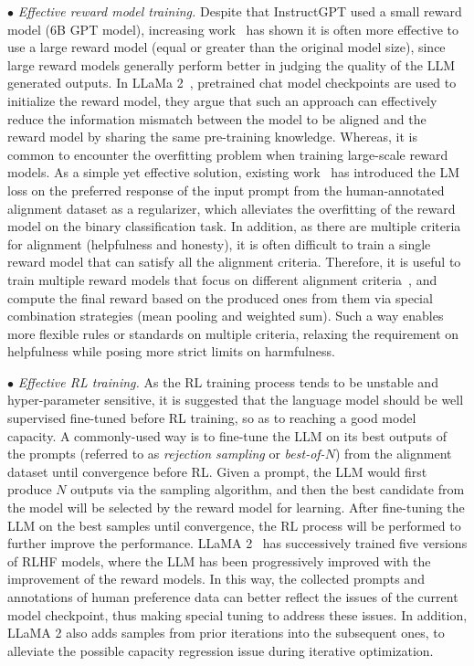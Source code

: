 {$\bullet$ \textit{Effective reward model training.} 
Despite that InstructGPT used a small reward model (6B GPT model), increasing work~\cite{Touvron-2023-llama2-arxiv} has shown it is often more effective to use a large reward model (\eg  equal or greater than the original model size), since large reward models generally perform better in judging the quality of the LLM generated outputs. 
In LLaMa 2~\cite{Touvron-2023-llama2-arxiv},  pretrained chat model checkpoints are used 
to initialize the reward model, they argue that such an approach can effectively reduce the information mismatch between the model to be aligned and the reward model by sharing the same pre-training knowledge.   
Whereas, it is common to encounter the overfitting problem when training large-scale reward models. As a simple yet effective solution, existing work~\cite{askell2021general,zheng2023secrets} has introduced the LM loss on the preferred response of the input prompt from the human-annotated alignment dataset as a regularizer, which alleviates the overfitting of the reward model on the binary classification task. 
In addition, as there are multiple criteria for alignment (\eg helpfulness and honesty), it is often difficult to train a single reward model that can satisfy all the alignment  criteria.
Therefore, it is useful to train multiple reward models that focus on different alignment criteria~\cite{Touvron-2023-llama2-arxiv}, and compute the final reward based on the produced ones from them via special combination strategies (\eg mean pooling and weighted sum).
Such a way enables more  flexible rules or standards on multiple  criteria, \eg  
relaxing the requirement on helpfulness while posing more strict limits on harmfulness.} 

{$\bullet$ \textit{Effective RL training.}
As the RL training process tends to  be unstable and hyper-parameter sensitive,
it is suggested that the language model should be well supervised fine-tuned
 before RL training, so as to reaching a good model capacity.  
A commonly-used way is to fine-tune the LLM on its best outputs of the prompts (referred to as \emph{rejection sampling} or \emph{best-of-$N$}) from the alignment dataset until convergence before RL.
Given a prompt, the LLM would first produce $N$ outputs via the sampling algorithm, and then the best candidate from the model will be selected by the reward model for learning.
After fine-tuning the LLM on the best samples until convergence, the RL  process will be performed to further improve the performance.
LLaMA 2~\cite{Touvron-2023-llama2-arxiv} has successively trained five versions of RLHF models, where the LLM has been progressively improved with the improvement of the reward models.
In this way, the collected prompts and annotations of human preference data can better reflect the issues of the current model checkpoint, thus making special tuning to address these issues. 
In addition, LLaMA 2 also adds samples from prior iterations into the subsequent ones, to alleviate the possible capacity regression issue during iterative optimization.}
 

